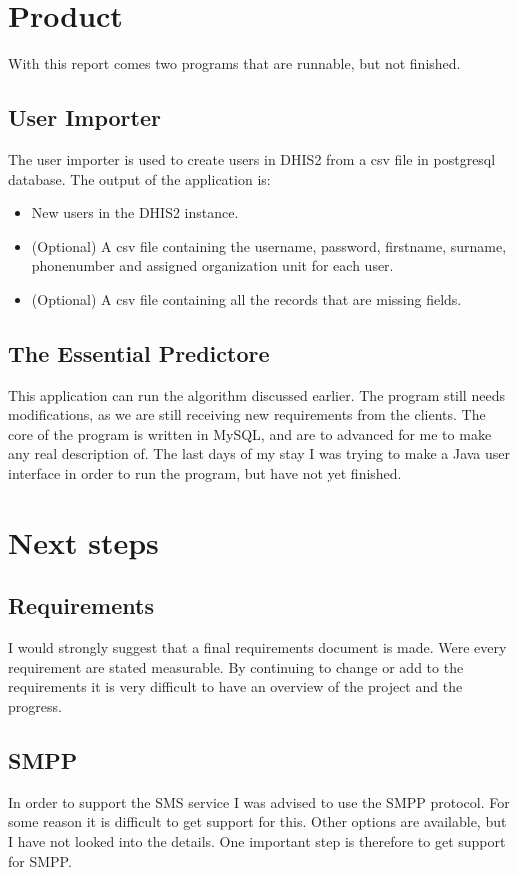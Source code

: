 \documentclass[a4paper]{report}
\begin{document}
\chapter{Product}
With this report comes two programs that are runnable, but not finished.
\section{User Importer}
The user importer is used to create users in DHIS2 from a csv file in postgresql database.
The output of the application is:
\begin{itemize}
	\item New users in the DHIS2 instance.
	\item (Optional) A csv file containing the username, password, firstname, surname, phonenumber and assigned organization unit for each user.
	\item (Optional) A csv file containing all the records that are missing fields.
\end{itemize}

\section{The Essential Predictore}
This application can run the algorithm discussed earlier. The program still needs modifications, as we are still receiving new requirements from the clients. The core of the program is written in MySQL, and are to advanced for me to make any real description of. The last days of my stay I was trying to make a Java user interface in order to run the program, but have not yet finished.

\chapter{Next steps}
\section{Requirements}
I would strongly suggest that a final requirements document is made. Were every requirement are stated measurable. By continuing to change or add to the requirements it is very difficult to have an overview of the project and the progress. 

\section{SMPP}
In order to support the SMS service I was advised to use the SMPP protocol. For some reason it is difficult to get support for this. Other options are available, but I have not looked into the details. One important step is therefore to get support for SMPP.
\end{document}
